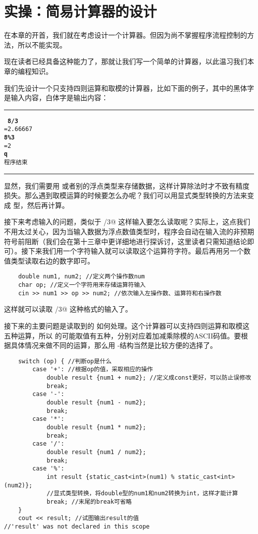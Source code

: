 \section{实操：简易计算器的设计}
在本章的开首，我们就在考虑设计一个计算器。但因为尚不掌握程序流程控制的方法，所以不能实现。\par
现在读者已经具备这种能力了，那就让我们写一个简单的计算器，以此温习我们本章的编程知识。\par
我们先设计一个只支持四则运算和取模的计算器，比如下面的例子，其中的黑体字是输入内容，白体字是输出内容：\\\noindent\rule{\linewidth}{0.2pt}\texttt{
\textbf{8/3}\\
=2.66667\\
\textbf{8\%3}\\
=2\\
\textbf{q}\\
程序结束
}\\\noindent\rule{\linewidth}{0.2pt}\par
显然，我们需要用 \lstinline@double@ 或者别的浮点类型来存储数据，这样计算除法时才不致有精度损失。那么遇到取模运算的时候要怎么办呢？我们可以用显式类型转换的方法来变成 \lstinline@int@ 型，然后再计算。\par
接下来考虑输入的问题，类似于 /3@ 这样输入要怎么读取呢？实际上，这点我们不用太过关心，因为当输入数据为浮点数值类型时，程序会自动在输入流的非预期符号前阻断（我们会在第十三章中更详细地进行探诉讨，这里读者只需知道结论即可）。接下来我们用一个字符输入就可以读取这个运算符字符。最后再用另一个数值类型读取右边的数字即可。
\begin{lstlisting}
    double num1, num2; //定义两个操作数num
    char op; //定义一个字符用来存储运算符输入
    cin >> num1 >> op >> num2; //依次输入左操作数、运算符和右操作数
\end{lstlisting}
这样就可以读取 /3@ 这种格式的输入了。\par
接下来的主要问题是读取到的 \lstinline@op@ 如何处理。这个计算器可以支持四则运算和取模这五种运算，所以 \lstinline@op@ 的可能取值有五种，分别对应着加减乘除模的ASCII码值。要根据具体情况来做不同的运算，那么用 \lstinline@switch@-\lstinline@case@ 结构当然是比较方便的选择了。
\begin{lstlisting}
    switch (op) { //判断op是什么
        case '+': //根据op的值，采取相应的操作
            double result {num1 + num2}; //定义成const更好，可以防止误修改
            break;
        case '-':
            double result {num1 - num2};
            break;
        case '*':
            double result {num1 * num2};
            break;
        case '/':
            double result {num1 / num2};
            break;
        case '%':
            int result {static_cast<int>(num1) % static_cast<int>(num2)};
            //显式类型转换，将double型的num1和num2转换为int，这样才能计算
            break; //末尾的break可省略
    }
    cout << result; //试图输出result的值
//'result' was not declared in this scope
\end{lstlisting}
